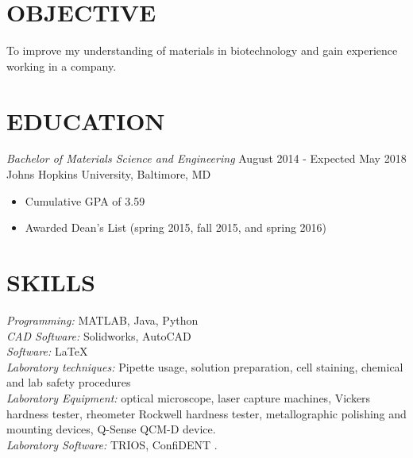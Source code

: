 \documentclass[line, 10pt]{res} %
\begin{document}
\begin{resume}

 
\section{OBJECTIVE}  

To improve my understanding of materials in biotechnology and gain experience working in a company. 


\section{EDUCATION}

{\sl Bachelor of Materials Science and Engineering}  \hfill August 2014 - Expected May 2018 \\
Johns Hopkins University, Baltimore, MD\\
\begin{itemize}
\item Cumulative GPA of 3.59
\item Awarded Dean's List (spring 2015, fall 2015, and spring 2016)
\end{itemize}
 

\section{SKILLS} 

{\sl Programming:} MATLAB, Java, Python \\
{\sl CAD Software:} Solidworks, AutoCAD\\
{\sl Software:}  \LaTeX\\
{\sl Laboratory techniques:} Pipette usage, solution preparation, cell staining, chemical and lab safety procedures \\
{\sl Laboratory Equipment:} optical microscope, laser capture machines, Vickers hardness tester, rheometer Rockwell hardness tester, metallographic polishing and mounting devices, Q-Sense QCM-D device.\\
{\sl Laboratory Software:} TRIOS, ConfiDENT .\\
 

\end{resume}
\end{document}
